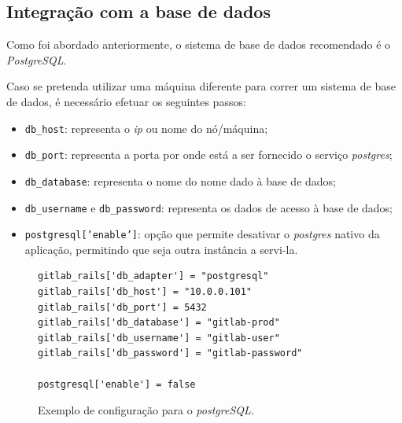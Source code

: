 \documentclass[12pt,a4paper]{article}
\begin{document}
\subsection{Integração com a base de dados}

Como foi abordado anteriormente, o sistema de base de dados recomendado é o \emph{PostgreSQL}. 

Caso se pretenda utilizar uma máquina diferente para correr um sistema de base de dados, é necessário efetuar os seguintes passos:

\begin{itemize}
    \item \texttt{db\_host}: representa o \emph{ip} ou nome do nó/máquina;
    \item \texttt{db\_port}: representa a porta por onde está a ser fornecido o serviço \emph{postgres};
    \item \texttt{db\_database}: representa o nome do nome dado à base de dados;
    \item \texttt{db\_username} e \texttt{db\_password}: representa os dados de acesso à base de dados;
    \item \texttt{postgresql['enable']}: opção que permite desativar o \emph{postgres} nativo da aplicação, permitindo que seja outra instância a servi-la.
\end{itemize}


\begin{figure}[H]
\centering
\begin{verbatim}
gitlab_rails['db_adapter'] = "postgresql"
gitlab_rails['db_host'] = "10.0.0.101"  
gitlab_rails['db_port'] = 5432
gitlab_rails['db_database'] = "gitlab-prod"  
gitlab_rails['db_username'] = "gitlab-user"  
gitlab_rails['db_password'] = "gitlab-password"  

postgresql['enable'] = false
\end{verbatim}
\caption{Exemplo de configuração para o \emph{postgreSQL}.}
\label{fig:c}
\end{figure}
\end{document}
